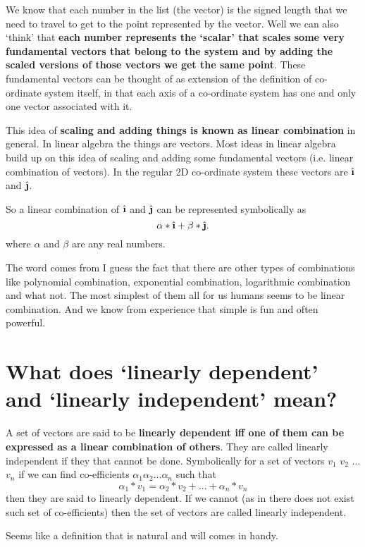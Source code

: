 \documentclass[../main.tex]{subfiles}
\begin{document}
We know that each number in the list (the vector) is the signed length that we need to travel to get to the point represented by the vector.
Well we can also `think' that \textbf{each number represents the `scalar' that scales some very fundamental vectors that belong to the system and by adding the scaled versions of those vectors we get the same point}. These fundamental vectors can be thought of as extension of the definition of co-ordinate system itself, in that each axis of a co-ordinate system has one and only one vector associated with it.

This idea of \textbf{scaling and adding things is known as linear combination} in general. In linear algebra the things are vectors. Most ideas in linear algebra build up on this idea of scaling and adding some fundamental vectors (i.e. linear combination of vectors). In the regular 2D co-ordinate system these vectors are $ \ihat $ and $ \jhat $.

So a linear combination of $ \ihat $ and $ \jhat $ can be represented symbolically as \[
\alpha * \ihat + \beta * \jhat
.\] where $ \alpha $ and $ \beta $ are any real numbers.

The word comes from I guess the fact that there are other types of combinations like polynomial combination, exponential combination, logarithmic combination and what not. The most simplest of them all for us humans seems to be linear combination. And we know from experience that simple is fun and often powerful.

\pagebreak

\section{What does `linearly dependent' and `linearly independent' mean?}

A set of vectors are said to be \textbf{linearly dependent iff one of them can be expressed as a linear combination of others}. They are called linearly independent if they that cannot be done. Symbolically for a set of vectors $ v_1 $ $ v_2 $ ... $ v_n $ if we can find co-efficients $ \alpha_1 \alpha_2 ... \alpha_n $ such that \[ \alpha_1 * v_1  = \alpha_2 * v_2 + ... + \alpha_n * v_n \] then they are said to linearly dependent. If we cannot (as in there does not exist such set of co-efficients) then the set of vectors are called linearly independent.

Seems like a definition that is natural and will comes in handy.

\pagebreak
\end{document}
